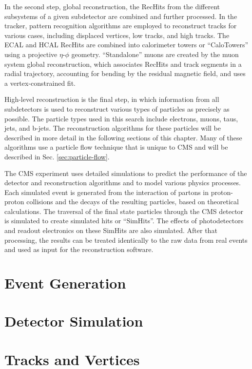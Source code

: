\documentclass[12pt]{thesis}  %
\begin{document}
In the second step, global reconstruction, the RecHits from the different subsystems of a given subdetector are combined and further processed. In the tracker, pattern recognition algorithms are employed to reconstruct tracks for various cases, including displaced vertices, low \pt tracks, and high \pt tracks. The ECAL and HCAL RecHits are combined into calorimeter towers or ``CaloTowers'' using a projective $\eta$-$\phi$ geometry. ``Standalone'' muons are created by the muon system global reconstruction, which associates RecHits and track segments in a radial trajectory, accounting for bending by the residual magnetic field, and uses a vertex-constrained fit.

High-level reconstruction is the final step, in which information from all subdetectors is used to reconstruct various types of particles as precisely as possible. The particle types used in this search include electrons, muons, taus, jets, and b-jets. The reconstruction algorithms for these particles will be described in more detail in the following sections of this chapter. Many of these algorithms use a particle flow technique that is unique to CMS and will be described in Sec. \ref{sec:particle-flow}.

The CMS experiment uses detailed simulations to predict the performance of the detector and reconstruction algorithms and to model various physics processes. Each simulated event is generated from the interaction of partons in proton-proton collisions and the decays of the resulting particles, based on theoretical calculations. The traversal of the final state particles through the CMS detector is simulated to create simulated hits or ``SimHits''. The effects of photodetectors and readout electronics on these SimHits are also simulated. After that processing, the results can be treated identically to the raw data from real events and used as input for the reconstruction software.

\section{Event Generation}

\section{Detector Simulation}

\section{Tracks and Vertices
\label{sec:tracks}}
\end{document}
